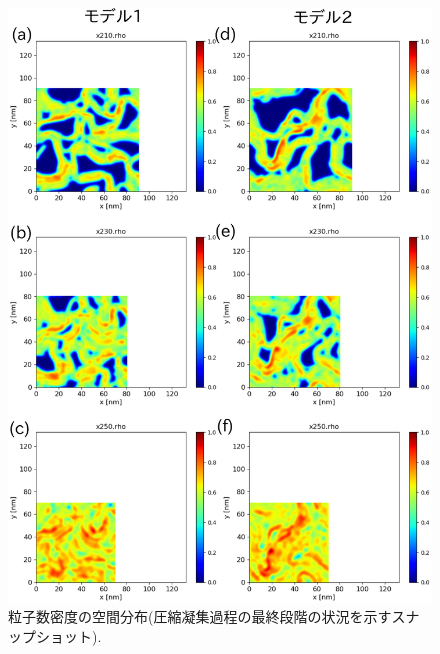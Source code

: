 \begin{figure}[h]
	\begin{center}
	\includegraphics[width=1.0\linewidth]{Figs/fig11.eps} 
	\end{center}
	\caption{
		粒子数密度の空間分布(圧縮凝集過程の最終段階の状況を示すスナップショット).
	} 
	\label{fig:fig11}
\end{figure}
